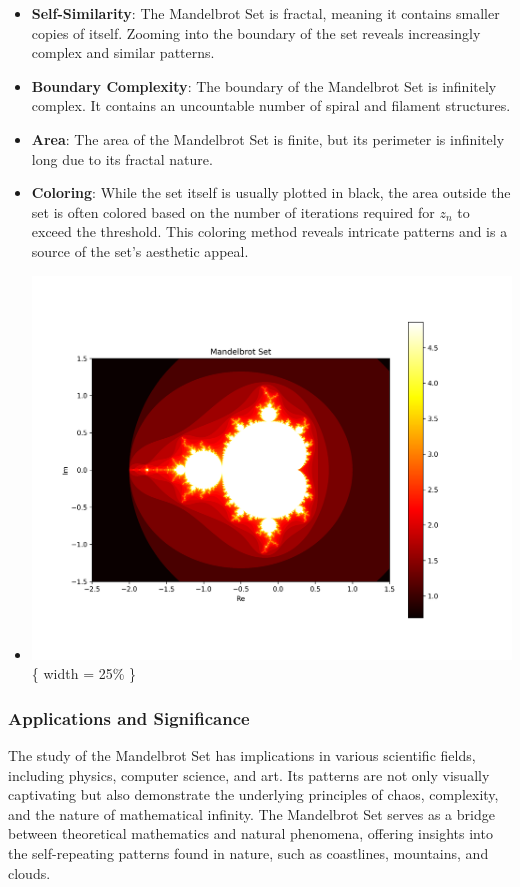 \documentclass[
]{article}
\providecommand{\tightlist}{%
  \setlength{\itemsep}{0pt}\setlength{\parskip}{0pt}}
\def\tightlist{}
\begin{document}
\begin{itemize}
\tightlist
\item
  \textbf{Self-Similarity}: The Mandelbrot Set is fractal, meaning it
  contains smaller copies of itself. Zooming into the boundary of the
  set reveals increasingly complex and similar patterns.
\item
  \textbf{Boundary Complexity}: The boundary of the Mandelbrot Set is
  infinitely complex. It contains an uncountable number of spiral and
  filament structures.
\item
  \textbf{Area}: The area of the Mandelbrot Set is finite, but its
  perimeter is infinitely long due to its fractal nature.
\item
  \textbf{Coloring}: While the set itself is usually plotted in black,
  the area outside the set is often colored based on the number of
  iterations required for \(z_n\) to exceed the threshold. This coloring
  method reveals intricate patterns and is a source of the set's
  aesthetic appeal.
\item
  \includegraphics{mandelbrot.png}\{ width = 25\% \}
\end{itemize}

\subsubsection{Applications and
Significance}\label{applications-and-significance}

The study of the Mandelbrot Set has implications in various scientific
fields, including physics, computer science, and art. Its patterns are
not only visually captivating but also demonstrate the underlying
principles of chaos, complexity, and the nature of mathematical
infinity. The Mandelbrot Set serves as a bridge between theoretical
mathematics and natural phenomena, offering insights into the
self-repeating patterns found in nature, such as coastlines, mountains,
and clouds.
\end{document}
